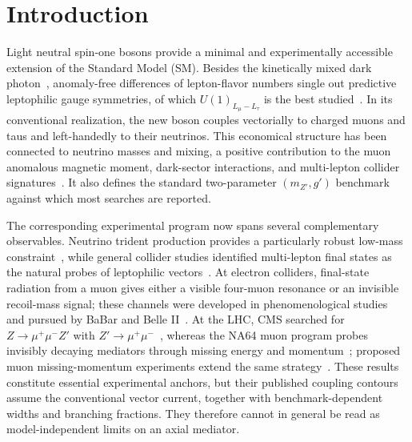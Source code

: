 \documentclass[onecolumn, aps, nofootinbib, prd, preprint, floats, floatfix, amsmath, amssymb, superscriptaddress, preprintnumbers]{revtex4-2}
\begin{document}
\endgroup

\makeatletter
\@booleantrue\preprintsty@sw
\makeatother

\clearpage
\tableofcontents

\newpage

\section{Introduction}
\label{sec:introduction}

Light neutral spin-one bosons provide a minimal and experimentally accessible extension of the Standard Model (SM). Besides the kinetically mixed dark photon~\cite{Holdom:1985ag}, anomaly-free differences of lepton-flavor numbers single out predictive leptophilic gauge symmetries, of which $U(1)_{L_\mu-L_\tau}$ is the best studied~\cite{Foot:1990mn,He:1990pn,He:1991qd}. In its conventional realization, the new boson couples vectorially to charged muons and taus and left-handedly to their neutrinos. This economical structure has been connected to neutrino masses and mixing, a positive contribution to the muon anomalous magnetic moment, dark-sector interactions, and multi-lepton collider signatures~\cite{Baek:2001kca,Ma:2001md,Heeck:2011wj,Harigaya:2013twa,Altmannshofer:2014cfa,Crivellin:2015mga,Altmannshofer:2016brv}. It also defines the standard two-parameter $(m_{Z'},g')$ benchmark against which most searches are reported.

The corresponding experimental program now spans several complementary observables. Neutrino trident production provides a particularly robust low-mass constraint~\cite{Altmannshofer:2014pba}, while general collider studies identified multi-lepton final states as the natural probes of leptophilic vectors~\cite{delAguila:2014soa}. At electron colliders, final-state radiation from a muon gives either a visible four-muon resonance or an invisible recoil-mass signal; these channels were developed in phenomenological studies~\cite{Araki:2017wyg,Brown:2024jah} and pursued by BaBar and Belle II~\cite{BaBar:2016sci,Belle-II:2019qfb,Belle-II:2022yaw,Belle-II:2024wtd}. At the LHC, CMS searched for $Z\to\mu^+\mu^-Z'$ with $Z'\to\mu^+\mu^-$~\cite{CMS:2018yxg}, whereas the NA64 muon program probes invisibly decaying mediators through missing energy and momentum~\cite{NA64:2024klw}; proposed muon missing-momentum experiments extend the same strategy~\cite{Kahn:2018cqs}. These results constitute essential experimental anchors, but their published coupling contours assume the conventional vector current, together with benchmark-dependent widths and branching fractions. They therefore cannot in general be read as model-independent limits on an axial mediator.
\end{document}
